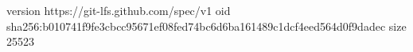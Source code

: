 version https://git-lfs.github.com/spec/v1
oid sha256:b010741f9fe3cbcc95671ef08fed74bc6d6ba161489c1dcf4eed564d0f9dadec
size 25523

